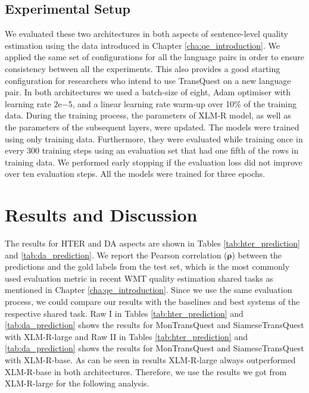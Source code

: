 \subsection{Experimental Setup}
\label{sec:transquest_experiment}
We evaluated these two architectures in both aspects of sentence-level quality estimation using the data introduced in Chapter \ref{cha:qe_introduction}. We applied the same set of configurations for all the language pairs in order to ensure consistency between all the experiments. This also provides a good starting configuration for researchers who intend to use TransQuest on a new language pair. In both architectures we used a batch-size of eight, Adam optimiser with learning rate $2\mathrm{e}{-5}$, and a linear learning rate warm-up over 10\% of the training data. During the training process, the parameters of XLM-R model, as well as the parameters of the subsequent layers, were updated. The models were trained using only training data. Furthermore, they were evaluated while training once in every 300 training steps using an evaluation set that had one fifth of the rows in training data. We performed early stopping if the evaluation loss did not improve over ten evaluation steps. All the models were trained for three epochs.

\section{Results and Discussion}
\label{sec:transquest_results}
The results for HTER and DA aspects are shown in Tables \ref{tab:hter_prediction} and \ref{tab:da_prediction}. We report the Pearson correlation ($\bm{\rho}$) between the predictions and the gold labels from the test set, which is the most commonly used evaluation metric in recent WMT quality estimation shared tasks \autocite{specia-etal-2018-findings,fonseca-etal-2019-findings,specia-etal-2020-findings-wmt} as mentioned in Chapter \ref{cha:qe_introduction}. Since we use the same evaluation process, we could compare our results with the baselines and best systems of the respective shared task. Raw I in Tables \ref{tab:hter_prediction} and \ref{tab:da_prediction} shows the results for MonTransQuest and SiameseTransQuest with XLM-R-large and Raw II in Tables \ref{tab:hter_prediction} and \ref{tab:da_prediction} shows the results for MonTransQuest and SiameseTransQuest with XLM-R-base. As can be seen in results XLM-R-large always outperformed XLM-R-base in both architectures. Therefore, we use the results we got from XLM-R-large for the following analysis.

